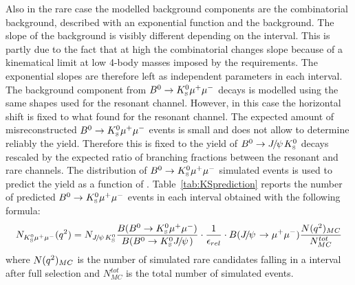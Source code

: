 Also in the rare case the modelled background components are
the combinatorial background, described with an exponential function and the \KS background. 
The slope of the background is visibly different depending on the \qsq interval. This is partly due to the 
fact that at high \qsq the combinatorial changes slope because of a kinematical limit at low 4-body
masses imposed by the \qsq requirements. The exponential slopes are therefore left as independent
parameters in each \qsq interval. %
The background component from $B^0\rightarrow K^0_{\rm\scriptscriptstyle S}\mu^+\mu^-$ decays is modelled using the same shapes used
for the resonant channel. However, in this case the horizontal shift is fixed to what found
for the resonant channel. The expected amount of misreconstructed $B^0\rightarrow K^0_{\rm\scriptscriptstyle S}\mu^+\mu^-$
events is small and does not allow to determine reliably the yield. Therefore
this is fixed to the yield of $\Bz\ra\jpsi\KS$ decays rescaled by the expected ratio
of branching fractions between the resonant and rare channels. The \qsq distribution of $B^0\rightarrow K^0_{\rm\scriptscriptstyle S}\mu^+\mu^-$ 
simulated events is used to predict the yield as a function of \qsq. Table~\ref{tab:KSprediction} reports the 
number of predicted $B^0\rightarrow K^0_{\rm\scriptscriptstyle S}\mu^+\mu^-$ events in each \qsq interval obtained with the following formula:
\begin{equation}
N_{\KS\mumu}(\qsq) = N_{\jpsi\KS}\frac{B(\Bz\ra\KS\mumu)}{B(\Bz\ra\KS\jpsi)}\cdot \frac{1}{\epsilon_{rel}} \cdot B(\jpsi\ra\mumu) \frac{N(\qsq)_{MC}}{N^{tot}_{MC}} 
\end{equation}
where $N(q^2)_{MC}$ is the number of simulated rare candidates falling in a \qsq interval after full selection and $N^{tot}_{MC}$ 
is the total number of simulated events. 

